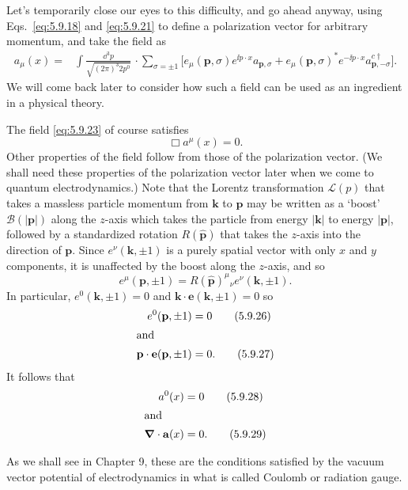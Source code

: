 Let's temporarily close our eyes to this difficulty, and go ahead anyway,
using Eqs.~\eqref{eq:5.9.18} and \eqref{eq:5.9.21} to define a polarization vector for arbitrary
momentum, and take the field as
\begin{align}
a_\mu(x)={}&\int \frac{\dd^3 p}{\sqrt{(2\pi)^3 2p^0}} \,
\cdot\sum_{\sigma=\pm1}\bigl[e_\mu(\mathbf p,\sigma)e^{\ii p\cdot x}
a_{\mathbf p,\sigma}+e_\mu(\mathbf p,\sigma)^*e^{-\ii p\cdot x}
a^{c\dagger}_{\mathbf p,-\sigma}\bigr].
\tag{5.9.23}\label{eq:5.9.23}
\end{align}
We will come back later to consider how such a field can be used as an
ingredient in a physical theory.

The field \eqref{eq:5.9.23} of course satisfies
\begin{equation}
\Box a^\mu(x)=0.
\tag{5.9.24}\label{eq:5.9.24}
\end{equation}
Other properties of the field follow from those of the polarization vector.
(We shall need these properties of the polarization vector later when we come
to quantum electrodynamics.) Note that the Lorentz transformation $\mathcal
L(p)$ that takes a massless particle momentum from $\mathbf k$ to $\mathbf p$
may be written as a `boost' $\mathcal B(|\mathbf p|)$ along the $z$-axis which
takes the particle from energy $|\mathbf k|$ to energy $|\mathbf p|$, followed
by a standardized rotation $R(\widehat{\mathbf p})$ that takes the $z$-axis
into the direction of $\mathbf p$. Since $e^\nu(\mathbf k,\pm1)$ is a purely
spatial vector with only $x$ and $y$ components, it is unaffected by the boost
along the $z$-axis, and so
\begin{equation}
e^\mu(\mathbf p,\pm1)=R(\widehat{\mathbf p})^\mu{}_\nu
e^\nu(\mathbf k,\pm1).
\tag{5.9.25}\label{eq:5.9.25}
\end{equation}
In particular, $e^0(\mathbf k,\pm1)=0$ and
$\mathbf k\cdot\mathbf e(\mathbf k,\pm1)=0$ so
\begin{align}
e^0(\mathbf p,\pm1)&=0
\tag{5.9.26}\label{eq:5.9.26}\\
\intertext{and}
\mathbf p\cdot\mathbf e(\mathbf p,\pm1)&=0.
\tag{5.9.27}\label{eq:5.9.27}
\end{align}
It follows that
\begin{align}
a^0(x)&=0
\tag{5.9.28}\label{eq:5.9.28}\\
\intertext{and}
\boldsymbol\nabla\cdot\mathbf a(x)&=0.
\tag{5.9.29}\label{eq:5.9.29}
\end{align}

As we shall see in Chapter 9, these are the conditions satisfied by the vacuum
vector potential of electrodynamics in what is called Coulomb or radiation
gauge.


